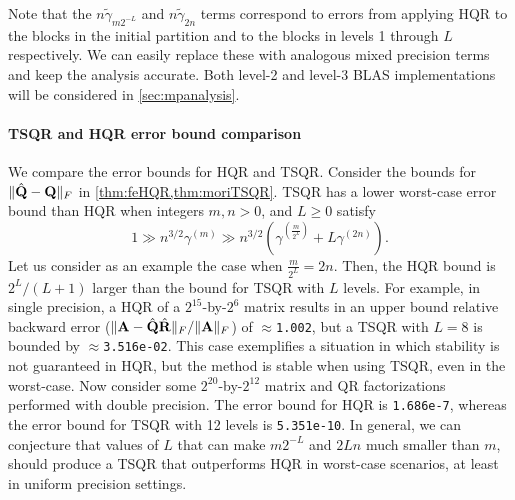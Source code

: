 Note that the $n\tilde{\gamma}_{m2^{-L}}$ and $n\tilde{\gamma}_{ 2n}$ terms correspond to errors from applying HQR to the blocks in the initial partition and to the blocks in levels 1 through $L$ respectively.
We can easily replace these with analogous mixed precision terms and keep the analysis accurate.
Both level-2 and level-3 BLAS implementations will be considered in \cref{sec:mpanalysis}.
\paragraph{TSQR and HQR error bound comparison}
We compare the error bounds for HQR and TSQR. 
Consider the bounds for $\|\hat{\mathbf{Q}}-\mathbf{Q}\|_F$ in \cref{thm:feHQR,thm:moriTSQR}.
TSQR has a lower worst-case error bound than HQR when integers $m, n > 0$, and $L\geq0$ satisfy
\begin{equation*}
1\gg n^{3/2}\gamma^{(m)} \gg n^{3/2}(\gamma^{(\frac{m}{2^L})}+L\gamma^{(2n)}).
\end{equation*}
Let us consider as an example the case when $\frac{m}{2^L}=2n$.
Then, the HQR bound is $2^L/(L+1)$ larger than the bound for TSQR with $L$ levels. 
For example, in single precision, a HQR of a $2^{15}$-by-$2^6$ matrix results in an upper bound relative backward error ($\|\mathbf{A}-\hat{\mathbf{Q}}\hat{\mathbf{R}}\|_F/\|\mathbf{A}\|_F$) of $\approx${\tt1.002}, but a TSQR with $L=8$ is bounded by $\approx${\tt 3.516e-02}. 
This case exemplifies a situation in which stability is not guaranteed in HQR, but the method is stable when using TSQR, even in the worst-case. 
Now consider some $2^{20}$-by-$2^{12}$ matrix and QR factorizations performed with double precision.
The error bound for HQR is {\tt 1.686e-7}, whereas the error bound for TSQR with 12 levels is {\tt 5.351e-10}.
In general, we can conjecture that values of $L$ that can make $m2^{-L}$ and $2Ln$ much smaller than $m$, should produce a TSQR that outperforms HQR in worst-case scenarios, at least in uniform precision settings.
